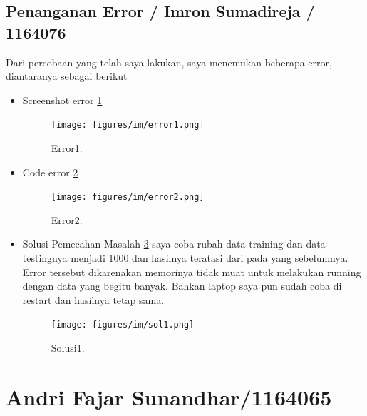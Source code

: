 \subsection{Penanganan Error / Imron Sumadireja / 1164076}
Dari percobaan yang telah saya lakukan, saya menemukan beberapa error, diantaranya sebagai berikut
\begin{itemize}
\item Screenshot error \ref{error1}
 		\begin{figure}[ht]
		\centerline{\texttt{[image: figures/im/error1.png]}}
		\caption{Error1.}
		\label{error1}
		\end{figure}

\item Code error \ref{error2}
 		\begin{figure}[ht]
		\centerline{\texttt{[image: figures/im/error2.png]}}
		\caption{Error2.}
		\label{error2}
		\end{figure}

\item Solusi Pemecahan Masalah \ref{sol1} saya coba rubah data training dan data testingnya menjadi 1000 dan hasilnya teratasi dari pada yang sebelumnya. Error tersebut dikarenakan memorinya tidak muat untuk melakukan running dengan data yang begitu banyak. Bahkan laptop saya pun sudah coba di restart dan hasilnya tetap sama.
 		\begin{figure}[ht]
		\centerline{\texttt{[image: figures/im/sol1.png]}}
		\caption{Solusi1.}
		\label{sol1}
		\end{figure}

\end{itemize}

\section{Andri Fajar Sunandhar/1164065}
